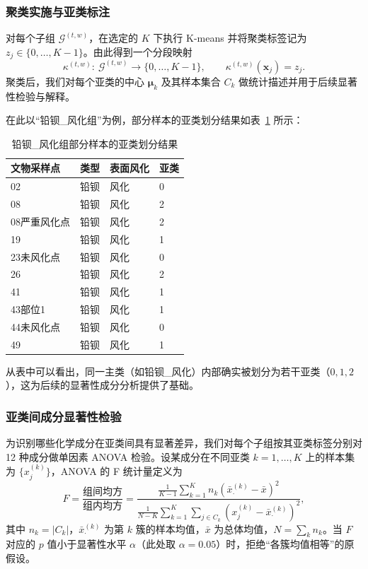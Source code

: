 \documentclass[withoutpreface,bwprint]{cumcmthesis}
\begin{document}
\subsubsection{聚类实施与亚类标注}
对每个子组 $\mathcal{G}^{(t,w)}$，在选定的 $K$ 下执行 K-means 并将聚类标签记为 $z_j\in\{0,\dots,K-1\}$。由此得到一个分段映射
\[
\kappa^{(t,w)}:\ \mathcal{G}^{(t,w)}\to\{0,\dots,K-1\},\qquad
\kappa^{(t,w)}(\mathbf{x}_j)=z_j.
\]
聚类后，我们对每个亚类的中心 $\boldsymbol{\mu}_{k}$ 及其样本集合 $C_k$ 做统计描述并用于后续显著性检验与解释。

在此以“铅钡\_风化组”为例，部分样本的亚类划分结果如表~\ref{tab:cluster_assign} 所示：

\begin{table}[htbp]
    \centering
    \caption{铅钡\_风化组部分样本的亚类划分结果}
    \label{tab:cluster_assign}
    \begin{tabular}{llll}
    \hline
    文物采样点 & 类型 & 表面风化 & 亚类 \\
    \hline
    02 & 铅钡 & 风化 & 0 \\
    08 & 铅钡 & 风化 & 2 \\
    08严重风化点 & 铅钡 & 风化 & 2 \\
    19 & 铅钡 & 风化 & 1 \\
    23未风化点 & 铅钡 & 风化 & 0 \\
    26 & 铅钡 & 风化 & 2 \\
    41 & 铅钡 & 风化 & 1 \\
    43部位1 & 铅钡 & 风化 & 1 \\
    44未风化点 & 铅钡 & 风化 & 0 \\
    49 & 铅钡 & 风化 & 1 \\
    \hline
    \end{tabular}
\end{table}

从表中可以看出，同一主类（如铅钡\_风化）内部确实被划分为若干亚类（$0,1,2$），这为后续的显著性成分分析提供了基础。


\subsubsection{亚类间成分显著性检验}
为识别哪些化学成分在亚类间具有显著差异，我们对每个子组按其亚类标签分别对 12 种成分做单因素 ANOVA 检验。设某成分在不同亚类 $k=1,\dots,K$ 上的样本集为 $\{x_{j}^{(k)}\}$，ANOVA 的 F 统计量定义为
\begin{equation}\label{eq:anova}
F=\frac{\text{组间均方}}{\text{组内均方}}
=\frac{\displaystyle\frac{1}{K-1}\sum_{k=1}^K n_k(\bar{x}_{\cdot}^{(k)}-\bar{x})^2}
{\displaystyle\frac{1}{N-K}\sum_{k=1}^K\sum_{j\in C_k}(x_j^{(k)}-\bar{x}_{\cdot}^{(k)})^2},
\end{equation}
其中 $n_k=|C_k|$，$\bar{x}_{\cdot}^{(k)}$ 为第 $k$ 簇的样本均值，$\bar{x}$ 为总体均值，$N=\sum_k n_k$。当 $F$ 对应的 $p$ 值小于显著性水平 $\alpha$（此处取 $\alpha=0.05$）时，拒绝“各簇均值相等”的原假设。
\end{document}
